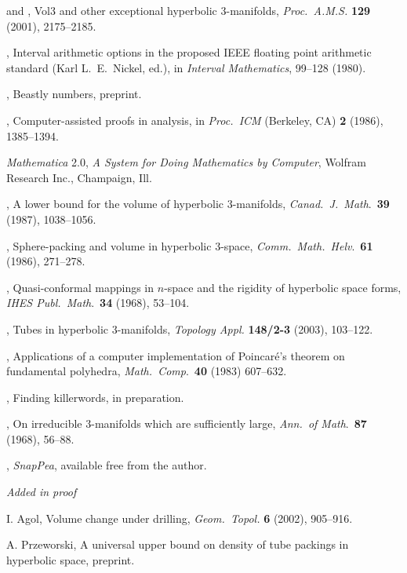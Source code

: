 \begin{references}
   and , Vol3 and other exceptional 
hyperbolic $3$-manifolds,  {\it Proc.\ A.M.S.} {\bf 129}
(2001), 2175--2185.
 
   , Interval arithmetic options in the 
proposed IEEE floating point arithmetic standard (Karl L.\ E.\ Nickel,
ed.), in  
{\it Interval Mathematics\/}, 99--128 (1980). 
 
   \bibline, Beastly numbers, preprint.
 
  , Computer-assisted proofs in analysis, 
in {\it Proc.\  ICM} (Berkeley, CA)  {\bf 2} (1986), 1385--1394.
 
  {\it Mathematica} 2.0, {\it A System for Doing Mathematics by Computer}, 
Wolfram Research Inc., Champaign,  Ill.
 
  , A lower bound for the volume of 
hyperbolic 
$3$-manifolds, {\it Canad.\ J.\ Math\/}.\ {\bf 39} (1987), 1038--1056.
 
  \bibline,  Sphere-packing and volume in 
hyperbolic $3$-space, {\it Comm.\ Math.\ Helv\/}.\  {\bf 61} (1986),
271--278.
 
  , Quasi-conformal mappings in $n$-space 
and the rigidity of hyperbolic space forms, {\it IHES Publ.\ Math\/}.\ 
{\bf 34} (1968), 53--104.
 
  , Tubes in hyperbolic $3$-manifolds, {\it Topology Appl.} {\bf
148/2-3} (2003), 103--122.
 
  , Applications of a computer implementation
of Poincar\'e's theorem on fundamental polyhedra,
{\it Math.\ Comp\/}.\  {\bf 40} (1983) 607--632.
 
  ,  Finding killerwords, in preparation. 
 


 , On irreducible $3$-manifolds which
are sufficiently large, {\it Ann.\ of Math\/}.\ {\bf 87} (1968), 56--88.
 
   , {\it SnapPea}, available free from the author.


\centerline{\elevenpoint\it Added in proof} 


 I. Agol, Volume change under drilling, {\it Geom.\ Topol.\/} {\bf 6} (2002), 905--916.

 A. Przeworski, A universal upper bound on density of tube packings in hyperbolic space,
preprint.

\end{references}

 



